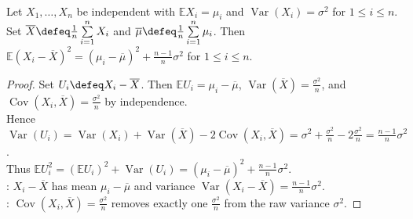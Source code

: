 \begin{lemma} \label{lem:mean-centering-expected-square} \\
Let $X_1,\ldots,X_n$ be independent with $\mathbb{E}X_i=\mu_i$ and $\operatorname{Var}(X_i)=\sigma^2$ for $1\leq i\leq n$.\\
Set $\overline{X}\defeq \frac{1}{n}\sum\limits_{i=1}^{n}X_i$ and $\overline{\mu}\defeq \frac{1}{n}\sum\limits_{i=1}^{n}\mu_i$.
Then $\mathbb{E}(X_i-\overline{X})^2=(\mu_i-\overline{\mu})^2+\frac{n-1}{n}\sigma^2$ for $1\leq i\leq n$.
\begin{proof}
Set $U_i\defeq X_i-\overline{X}$. Then $\mathbb{E}U_i=\mu_i-\overline{\mu}$, $\operatorname{Var}(\overline{X})=\frac{\sigma^2}{n}$, and $\operatorname{Cov}(X_i,\overline{X})=\frac{\sigma^2}{n}$ by independence.\\
Hence $\operatorname{Var}(U_i)=\operatorname{Var}(X_i)+\operatorname{Var}(\overline{X})-2\operatorname{Cov}(X_i,\overline{X})=\sigma^2+\frac{\sigma^2}{n}-2\frac{\sigma^2}{n}=\frac{n-1}{n}\sigma^2$.\\
Thus $\mathbb{E}U_i^2=(\mathbb{E}U_i)^2+\operatorname{Var}(U_i)=(\mu_i-\overline{\mu})^2+\frac{n-1}{n}\sigma^2$.\\
: $X_i-\overline{X}$ has mean $\mu_i-\overline{\mu}$ and variance $\operatorname{Var}(X_i-\overline{X})=\frac{n-1}{n}\sigma^2$.\\
: $\operatorname{Cov}(X_i,\overline{X})=\frac{\sigma^2}{n}$ removes exactly one $\frac{\sigma^2}{n}$ from the raw variance $\sigma^2$.
\end{proof}
\end{lemma}

